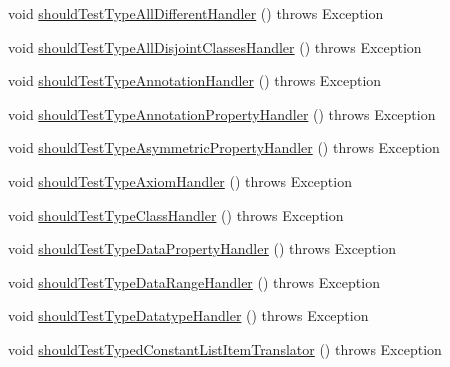 \begin{DoxyCompactItemize}
\item 
void \hyperlink{classorg_1_1semanticweb_1_1owlapi_1_1contract_1_1_contract_rdfxml_parser_test_a2d1f4c4ac4df336461352b617a9951d8}{should\-Test\-Type\-All\-Different\-Handler} ()  throws Exception 
\item 
void \hyperlink{classorg_1_1semanticweb_1_1owlapi_1_1contract_1_1_contract_rdfxml_parser_test_ac818d3e8fee5ceaebb25542e71af1d6d}{should\-Test\-Type\-All\-Disjoint\-Classes\-Handler} ()  throws Exception 
\item 
void \hyperlink{classorg_1_1semanticweb_1_1owlapi_1_1contract_1_1_contract_rdfxml_parser_test_a37e3fdc3cfedc192c034d33132018cff}{should\-Test\-Type\-Annotation\-Handler} ()  throws Exception 
\item 
void \hyperlink{classorg_1_1semanticweb_1_1owlapi_1_1contract_1_1_contract_rdfxml_parser_test_a5a927dec665dee19a295025a1fdcd648}{should\-Test\-Type\-Annotation\-Property\-Handler} ()  throws Exception 
\item 
void \hyperlink{classorg_1_1semanticweb_1_1owlapi_1_1contract_1_1_contract_rdfxml_parser_test_aea85647707d9cd0909f33d52369b3023}{should\-Test\-Type\-Asymmetric\-Property\-Handler} ()  throws Exception 
\item 
void \hyperlink{classorg_1_1semanticweb_1_1owlapi_1_1contract_1_1_contract_rdfxml_parser_test_a9e9f4a01eb3c59c268cef994ba3db258}{should\-Test\-Type\-Axiom\-Handler} ()  throws Exception 
\item 
void \hyperlink{classorg_1_1semanticweb_1_1owlapi_1_1contract_1_1_contract_rdfxml_parser_test_a22c186e2cf86e86c94c443cfb44cd741}{should\-Test\-Type\-Class\-Handler} ()  throws Exception 
\item 
void \hyperlink{classorg_1_1semanticweb_1_1owlapi_1_1contract_1_1_contract_rdfxml_parser_test_a7c72d9fa63f860d6af6bd19f9beedc23}{should\-Test\-Type\-Data\-Property\-Handler} ()  throws Exception 
\item 
void \hyperlink{classorg_1_1semanticweb_1_1owlapi_1_1contract_1_1_contract_rdfxml_parser_test_aa3877c9a1aeec39a1e1b374164956aaf}{should\-Test\-Type\-Data\-Range\-Handler} ()  throws Exception 
\item 
void \hyperlink{classorg_1_1semanticweb_1_1owlapi_1_1contract_1_1_contract_rdfxml_parser_test_ae9d11e1ed0b23ab844909e17375e935e}{should\-Test\-Type\-Datatype\-Handler} ()  throws Exception 
\item 
void \hyperlink{classorg_1_1semanticweb_1_1owlapi_1_1contract_1_1_contract_rdfxml_parser_test_a42edba10a650e782aa5059996d46e09c}{should\-Test\-Typed\-Constant\-List\-Item\-Translator} ()  throws Exception 

\end{DoxyCompactItemize}
